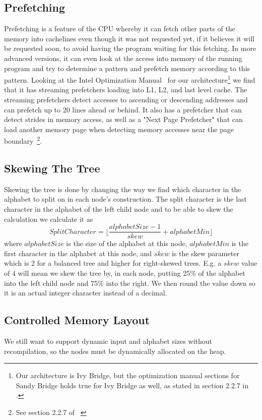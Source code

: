 \subsection{Prefetching}
Prefetching is a feature of the CPU whereby it can fetch other parts of the memory into cachelines even though it was not requested yet, if it believes it will be requested soon, to avoid having the program waiting for this fetching.
In more advanced versions, it can even look at the access into memory of the running program and try to determine a pattern and prefetch memory according to this pattern.
Looking at the Intel Optimization Manual~\cite{intel-optimization-manual} for our architecture\footnote{Our architecture is Ivy Bridge, but the optimization manual sections for Sandy Bridge holds true for Ivy Bridge as well, as stated in section 2.2.7 in \cite{intel-optimization-manual}.} we find that it has streaming prefetchers loading into L1, L2, and last level cache. The streaming prefetchers detect accesses to ascending or descending addresses and can prefetch up to 20 lines ahead or behind. It also has a prefetcher that can detect strides in memory access, as well as a "Next Page Prefetcher" that can load another memory page when detecting memory accesses near the page boundary~\footnote{See section 2.2.7 of ~\cite{intel-optimization-manual}}.


\subsection{Skewing The Tree}
\label{sec:SkewingTheTree}
Skewing the tree is done by changing the way we find which character in the alphabet to split on in each node's construction.
The split character is the last character in the alphabet of the left child node and to be able to skew the calculation we calculate it as
\[SplitCharacter = \lfloor \frac{alphabetSize-1}{skew} + alphabetMin \rfloor \]
where $alphabetSize$ is the size of the alphabet at this node, $alphabetMin$ is the first character in the alphabet at this node, and $skew$ is the skew parameter which is 2 for a balanced tree and higher for right-skewed trees. E.g. a $skew$ value of 4 will mean we skew the tree by, in each node, putting 25\% of the alphabet into the left child node and 75\% into the right.
We then round the value down so it is an actual integer character instead of a decimal.



\subsection{Controlled Memory Layout}
We still want to support dynamic input and alphabet sizes without recompilation, so the nodes must be dynamically allocated on the heap.

